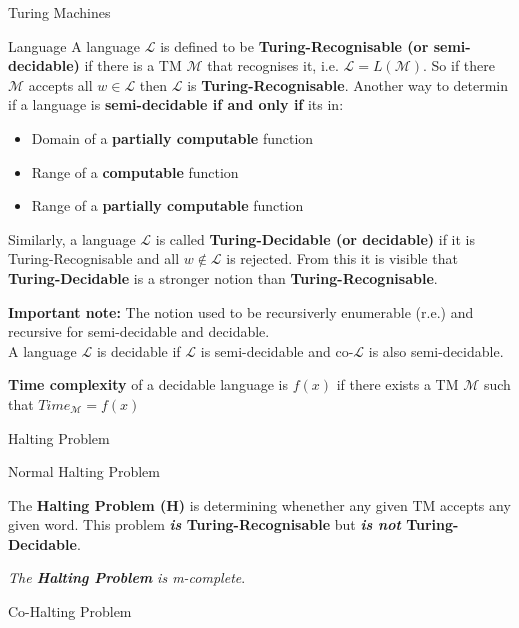 \documentclass[12pt, letterpaper]{article}
\begin{document}
\begin{section}{Turing Machines}
\begin{subsection}{Language}
    A language \(\mathscr{L}\) is defined to be \textbf{Turing-Recognisable (or semi-decidable)}
    if there is a TM \(\mathscr{M}\) that recognises it, i.e. \(\mathscr{L} = L(\mathscr{M})\).
    So if there \(\mathscr{M}\) accepts all \(\textit{w} \in \mathscr{L}\) then \(\mathscr{L}\)
    is \textbf{Turing-Recognisable}.
    Another way to determin if a language is \textbf{semi-decidable if and only if} its in:
    \begin{itemize}
      \item Domain of a \textbf{partially computable} function
      \item Range of a \textbf{computable} function
      \item Range of a \textbf{partially computable} function
    \end{itemize}

    Similarly, a language \(\mathscr{L}\) is called \textbf{Turing-Decidable (or decidable)}
    if it is Turing-Recognisable and all \(\textit{w} \notin \mathscr{L}\) is rejected.
    From this it is visible that \textbf{Turing-Decidable} is a stronger notion than
    \textbf{Turing-Recognisable}.

    \textbf{Important note:} The notion used to be recursiverly enumerable (r.e.)
    and recursive for semi-decidable and decidable. \\
    A language \(\mathscr{L}\) is decidable if \(\mathscr{L}\) is semi-decidable
    and co-\(\mathscr{L}\) is also semi-decidable.

    \textbf{Time complexity} of a decidable language is \(f(x)\) if there exists
    a TM \(\mathscr{M}\) such that \(Time_{\mathscr{M}} = f(x)\)

  \end{subsection}

  \begin{subsection}{Halting Problem}

    \begin{subsubsection}{Normal Halting Problem}

      The \textbf{Halting Problem (H)} is determining whenether any given TM
      accepts any given word. This problem \textbf{\emph{is} Turing-Recognisable}
      but \textbf{\emph{is not} Turing-Decidable}.

      \emph{The \textbf{Halting Problem} is m-complete}.

    \end{subsubsection}

    \begin{subsubsection}{Co-Halting Problem}


\end{subsubsection}
\end{subsection}
\end{section}
\end{document}
